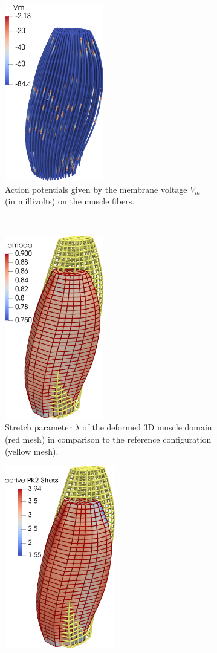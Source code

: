 \begin{figure}
  \centering%
  \begin{subfigure}[t]{0.31\textwidth}%
    \centering%
    \includegraphics[height=77mm]{images/results/application/contraction_fibers.png}%
    \caption{Action potentials given by the membrane voltage $V_m$ (in millivolts) on the muscle fibers.}%
    \label{fig:contraction_fibers}%
  \end{subfigure}\,
  \begin{subfigure}[t]{0.31\textwidth}%
    \centering%
    \includegraphics[height=8cm]{images/results/application/contraction_lambda.png}%
    \caption{Stretch parameter $\lambda$ of the deformed 3D muscle domain (red mesh) in comparison to the reference configuration (yellow mesh).}%
    \label{fig:contraction_lambda}%
  \end{subfigure}
  \begin{subfigure}[t]{0.31\textwidth}%
    \centering%
    \includegraphics[height=8cm]{images/results/application/contraction_active_stress.png}%

\end{subfigure}
\end{figure}

